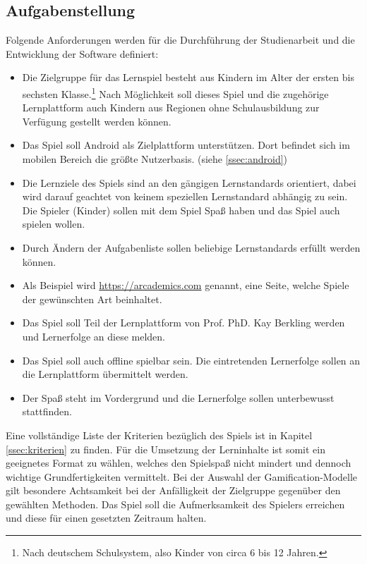 \subsection{Aufgabenstellung}
	Folgende Anforderungen werden für die Durchführung der Studienarbeit und die Entwicklung der Software definiert:
	\begin{itemize}
		\item{ Die Zielgruppe für das Lernspiel besteht aus Kindern im Alter der ersten bis sechsten Klasse.\footnote{Nach deutschem Schulsystem, also Kinder von circa 6 bis 12 Jahren.} Nach Möglichkeit soll dieses Spiel und die zugehörige Lernplattform auch Kindern aus Regionen ohne Schulausbildung zur Verfügung gestellt werden können. }
		\item{ Das Spiel soll Android als Zielplattform unterstützen. Dort befindet sich im mobilen Bereich die größte Nutzerbasis. (siehe \ref{ssec:android}) }
		\item{ Die Lernziele des Spiels sind an den gängigen Lernstandards orientiert, dabei wird darauf geachtet von keinem speziellen Lernstandard abhängig zu sein. Die Spieler (Kinder) sollen mit dem Spiel Spaß haben und das Spiel auch spielen wollen. }
		\item{ Durch Ändern der Aufgabenliste sollen beliebige Lernstandards erfüllt werden können. }
		\item{ Als Beispiel wird \url{https://arcademics.com} genannt, eine Seite, welche Spiele der gewünschten Art beinhaltet. }
		\item{ Das Spiel soll Teil der Lernplattform von Prof. PhD. Kay Berkling werden und Lernerfolge an diese melden. }
		\item{ Das Spiel soll auch offline spielbar sein. Die eintretenden Lernerfolge sollen an die Lernplattform übermittelt werden. }
		\item{ Der Spaß steht im Vordergrund und die Lernerfolge sollen unterbewusst stattfinden. }
	\end{itemize}
	Eine vollständige Liste der Kriterien bezüglich des Spiels ist in Kapitel \ref{ssec:kriterien} zu finden.
	Für die Umsetzung der Lerninhalte ist somit ein geeignetes Format zu wählen, welches den Spielspaß nicht mindert und dennoch wichtige Grundfertigkeiten vermittelt.
	Bei der Auswahl der Gamification-Modelle gilt besondere Achtsamkeit bei der Anfälligkeit der Zielgruppe gegenüber den gewählten Methoden. Das Spiel soll die Aufmerksamkeit des Spielers erreichen und diese für einen gesetzten Zeitraum halten.

